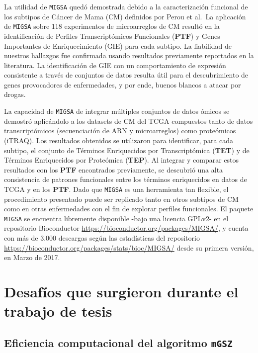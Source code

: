 \documentclass[12pt,twoside]{reedthesis}
\begin{document}
La utilidad de \texttt{MIGSA} quedó demostrada debido a la caracterización funcional de los subtipos de Cáncer de Mama (CM) definidos por Perou et al.~La aplicación de \texttt{MIGSA} sobre 118 experimentos de microarreglos de CM resultó en la identificación de Perfiles Transcriptómicos Funcionales (\textbf{PTF}) y Genes Importantes de Enriquecimiento (GIE) para cada subtipo. La fiabilidad de nuestros hallazgos fue confirmada usando resultados previamente reportados en la literatura. La identificación de GIE con un comportamiento de expresión consistente a través de conjuntos de datos resulta útil para el descubrimiento de genes provocadores de enfermedades, y por ende, buenos blancos a atacar por drogas.

\par

La capacidad de \texttt{MIGSA} de integrar múltiples conjuntos de datos ómicos se demostró aplicándolo a los datasets de CM del TCGA compuestos tanto de datos transcriptómicos (secuenciación de ARN y microarreglos) como proteómicos (iTRAQ). Los resultados obtenidos se utilizaron para identificar, para cada subtipo, el conjunto de Términos Enriquecidos por Transcriptómica (\textbf{TET}) y de Términos Enriquecidos por Proteómica (\textbf{TEP}). Al integrar y comparar estos resultados con los \textbf{PTF} encontrados previamente, se descubrió una alta consistencia de patrones funcionales entre los términos enriquecidos en datos de TCGA y en los \textbf{PTF}. Dado que \texttt{MIGSA} es una herramienta tan flexible, el procedimiento presentado puede ser replicado tanto en otros subtipos de CM como en otras enfermedades con el fin de explorar perfiles funcionales. El paquete \texttt{MIGSA} se encuentra libremente disponible -bajo una licencia GPLv2- en el repositorio Bioconductor \url{https://bioconductor.org/packages/MIGSA/}, y cuenta con más de 3.000 descargas según las estadísticas del repositorio \url{https://bioconductor.org/packages/stats/bioc/MIGSA/} desde su primera versión, en Marzo de 2017.

\hypertarget{cap:desafios}{%
\chapter{Desafíos que surgieron durante el trabajo de tesis}\label{cap:desafios}}

\hypertarget{eficiencia-computacional-del-algoritmo-mgsz}{%
\section{\texorpdfstring{Eficiencia computacional del algoritmo \texttt{mGSZ}}{Eficiencia computacional del algoritmo mGSZ}}\label{eficiencia-computacional-del-algoritmo-mgsz}}
\end{document}
